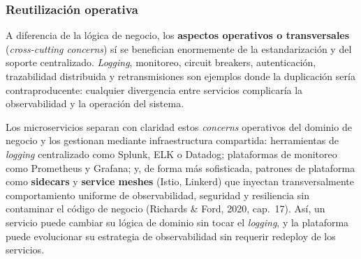 \subsubsection{Reutilización operativa}

A diferencia de la lógica de negocio, los \textbf{aspectos operativos o transversales}
(\emph{cross-cutting concerns}) sí se benefician enormemente de la estandarización y
del soporte centralizado. \emph{Logging}, monitoreo, circuit breakers, autenticación,
trazabilidad distribuida y retransmisiones son ejemplos donde la duplicación sería
contraproducente: cualquier divergencia entre servicios complicaría la observabilidad
y la operación del sistema.

Los microservicios separan con claridad estos \emph{concerns} operativos del dominio
de negocio y los gestionan mediante infraestructura compartida: herramientas de
\emph{logging} centralizado como Splunk, ELK o Datadog; plataformas de monitoreo como
Prometheus y Grafana; y, de forma más sofisticada, patrones de plataforma como
\textbf{sidecars} y \textbf{service meshes} (Istio, Linkerd) que inyectan
transversalmente comportamiento uniforme de observabilidad, seguridad y resiliencia
sin contaminar el código de negocio (Richards \& Ford, 2020, cap.~17). Así, un
servicio puede cambiar su lógica de dominio sin tocar el \emph{logging}, y la
plataforma puede evolucionar su estrategia de observabilidad sin requerir redeploy de
los servicios.
